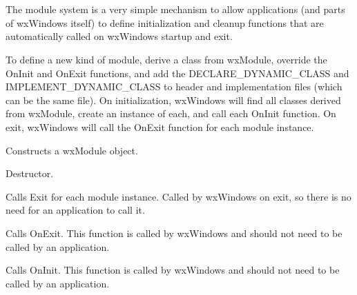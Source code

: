 \section{}\label{wxmodule}

The module system is a very simple mechanism to allow applications (and parts of wxWindows itself) to
define initialization and cleanup functions that are automatically called on wxWindows
startup and exit.

To define a new kind of module, derive a class from wxModule, override the OnInit and OnExit functions,
and add the DECLARE\_DYNAMIC\_CLASS and IMPLEMENT\_DYNAMIC\_CLASS to header and implementation files
(which can be the same file). On initialization, wxWindows will find all classes derived from wxModule,
create an instance of each, and call each OnInit function. On exit, wxWindows will call the OnExit
function for each module instance.




\label{wxmoduleconstr}


Constructs a wxModule object.



Destructor.

\label{wxmodulecleanupmodules}


Calls Exit for each module instance. Called by wxWindows on exit, so there is no
need for an application to call it.

\label{wxmoduleexit}


Calls OnExit. This function is called by wxWindows and should not need to be called
by an application.

\label{wxmoduleinit}


Calls OnInit. This function is called by wxWindows and should not need to be called
by an application.

